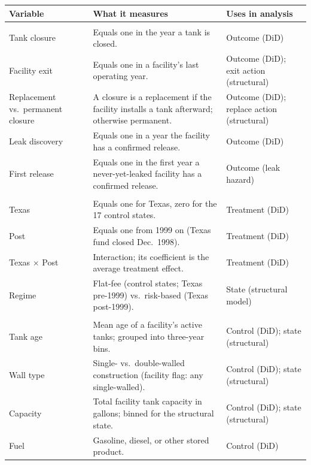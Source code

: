 \begin{threeparttable}
\scriptsize
\setlength{\tabcolsep}{4pt}
\renewcommand{\arraystretch}{1.02}
\begin{tabular}{@{}p{2.9cm}p{7.4cm}p{3.7cm}@{}}
\toprule
\textbf{Variable} & \textbf{What it measures} & \textbf{Uses in analysis} \\
\midrule
\addlinespace\multicolumn{3}{@{}l}{\textit{Outcomes}}\\[1pt]
Tank closure & Equals one in the year a tank is closed. & Outcome (DiD) \\
Facility exit & Equals one in a facility's last operating year. & Outcome (DiD); exit action (structural) \\
Replacement vs.\ permanent closure & A closure is a replacement if the facility installs a tank afterward; otherwise permanent. & Outcome (DiD); replace action (structural) \\
Leak discovery & Equals one in a year the facility has a confirmed release. & Outcome (DiD) \\
First release & Equals one in the first year a never-yet-leaked facility has a confirmed release. & Outcome (leak hazard) \\
\addlinespace\multicolumn{3}{@{}l}{\textit{Treatment and regime}}\\[1pt]
Texas & Equals one for Texas, zero for the 17 control states. & Treatment (DiD) \\
Post & Equals one from 1999 on (Texas fund closed Dec.\ 1998). & Treatment (DiD) \\
Texas $\times$ Post & Interaction; its coefficient is the average treatment effect. & Treatment (DiD) \\
Regime & Flat-fee (control states; Texas pre-1999) vs.\ risk-based (Texas post-1999). & State (structural model) \\
\addlinespace\multicolumn{3}{@{}l}{\textit{Tank and facility characteristics}}\\[1pt]
Tank age & Mean age of a facility's active tanks; grouped into three-year bins. & Control (DiD); state (structural) \\
Wall type & Single- vs.\ double-walled construction (facility flag: any single-walled). & Control (DiD); state (structural) \\
Capacity & Total facility tank capacity in gallons; binned for the structural state. & Control (DiD); state (structural) \\
Fuel & Gasoline, diesel, or other stored product. & Control (DiD) \\

\end{tabular}
\end{threeparttable}
